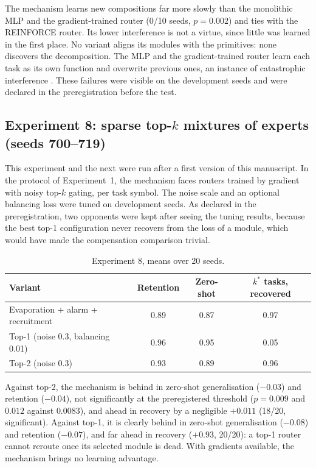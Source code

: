 \documentclass[11pt,a4paper]{article}
\begin{document}
The mechanism learns new compositions far more slowly than the monolithic MLP and the gradient-trained router (0/10 seeds, $p = 0.002$) and ties with the REINFORCE router. Its lower interference is not a virtue, since little was learned in the first place. No variant aligns its modules with the primitives: none discovers the decomposition. The MLP and the gradient-trained router learn each task as its own function and overwrite previous ones, an instance of catastrophic interference \citep{mccloskey1989catastrophic}. These failures were visible on the development seeds and were declared in the preregistration before the test.

\subsection{Experiment 8: sparse top-$k$ mixtures of experts (seeds 700--719)}

This experiment and the next were run after a first version of this manuscript. In the protocol of Experiment~1, the mechanism faces routers trained by gradient with noisy top-$k$ gating, per task symbol. The noise scale and an optional balancing loss were tuned on development seeds. As declared in the preregistration, two opponents were kept after seeing the tuning results, because the best top-1 configuration never recovers from the loss of a module, which would have made the compensation comparison trivial.

\begin{table}[h]
\centering\small\setlength{\tabcolsep}{5pt}
\begin{tabular}{lccc}
\toprule
Variant & Retention & Zero-shot & $k^*$ tasks, recovered \\
\midrule
Evaporation + alarm + recruitment & 0.89 & 0.87 & 0.97 \\
Top-1 (noise 0.3, balancing 0.01) & 0.96 & 0.95 & 0.05 \\
Top-2 (noise 0.3) & 0.93 & 0.89 & 0.96 \\
\bottomrule
\end{tabular}
\caption{Experiment 8, means over 20 seeds.}
\label{tab:exp8}
\end{table}

Against top-2, the mechanism is behind in zero-shot generalisation ($-0.03$) and retention ($-0.04$), not significantly at the preregistered threshold ($p = 0.009$ and $0.012$ against $0.0083$), and ahead in recovery by a negligible $+0.011$ (18/20, significant). Against top-1, it is clearly behind in zero-shot generalisation ($-0.08$) and retention ($-0.07$), and far ahead in recovery ($+0.93$, 20/20): a top-1 router cannot reroute once its selected module is dead. With gradients available, the mechanism brings no learning advantage.
\end{document}
